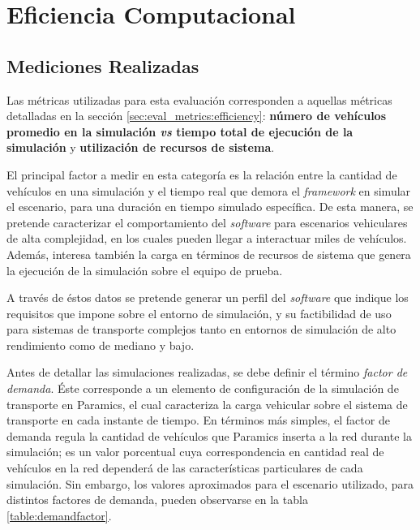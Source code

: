 \section{Eficiencia Computacional}\label{sec:results:performance}
\subsection{Mediciones Realizadas}

Las métricas utilizadas para esta evaluación corresponden a aquellas métricas detalladas en la sección \ref{sec:eval_metrics:efficiency}: \textbf{número de vehículos promedio en la simulación \emph{vs} tiempo total de ejecución de la simulación} y \textbf{utilización de recursos de sistema}.

El principal factor a medir en esta categoría es la relación entre la cantidad de vehículos en una simulación y el tiempo real que demora el \emph{framework} en simular el escenario, para una duración en tiempo simulado específica. De esta manera, se pretende caracterizar el comportamiento del \emph{software} para escenarios vehiculares de alta complejidad, en los cuales pueden llegar a interactuar miles de vehículos. Además, interesa también la carga en términos de recursos de sistema que genera la ejecución de la simulación sobre el equipo de prueba. 

A través de éstos datos se pretende generar un perfil del \emph{software} que indique los requisitos que impone sobre el entorno de simulación, y su factibilidad de uso para sistemas de transporte complejos tanto en entornos de simulación de alto rendimiento como de mediano y bajo.

Antes de detallar las simulaciones realizadas, se debe definir el término \emph{factor de demanda}. Éste corresponde a un elemento de configuración de la simulación de transporte en Paramics, el cual caracteriza la carga vehicular sobre el sistema de transporte en cada instante de tiempo. En términos más simples, el factor de demanda regula la cantidad de vehículos que Paramics inserta a la red durante la simulación; es un valor porcentual cuya correspondencia en cantidad real de vehículos en la red dependerá de las características particulares de cada simulación. Sin embargo, los valores aproximados para el escenario utilizado, para distintos factores de demanda, pueden observarse en la tabla \ref{table:demandfactor}.

